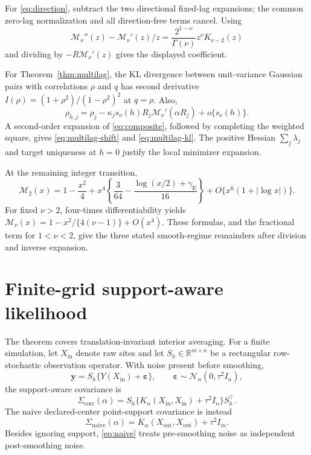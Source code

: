 \documentclass[sigconf]{acmart}
\theoremstyle{remark}
\newcommand{\Matern}{\mathcal M}
\newcommand{\R}{\mathbb R}
\newcommand{\Normal}{\mathcal N}
\begin{document}
For \eqref{eq:direction}, subtract the two directional fixed-lag expansions;
the common zero-lag normalization and all direction-free terms cancel. Using
\[
\Matern_\nu''(z)-\Matern_\nu'(z)/z
=\frac{2^{1-\nu}}{\Gamma(\nu)}z^\nu K_{\nu-2}(z)
\]
and dividing by \(-R\Matern_\nu'(z)\) gives the displayed coefficient.

For Theorem~\ref{thm:multilag}, the KL divergence between unit-variance
Gaussian pairs with correlations \(\rho\) and \(q\) has second derivative
\(I(\rho)=(1+\rho^2)/(1-\rho^2)^2\) at \(q=\rho\). Also,
\[
 \rho_{h,j}=\rho_j-\kappa_j s_\nu(h)R_j\Matern_\nu'(\alpha R_j)
 +o\{s_\nu(h)\}.
\]
A second-order expansion of \eqref{eq:composite}, followed by completing the
weighted square, gives \eqref{eq:multilag-shift} and
\eqref{eq:multilag-kl}. The positive Hessian \(\sum_j\lambda_j\) and target
uniqueness at \(h=0\) justify the local minimizer expansion.

At the remaining integer transition,
\[
\Matern_2(x)=1-\frac{x^2}{4}
+x^4\left\{\frac{3}{64}
-\frac{\log(x/2)+\gamma_{\mathrm E}}{16}\right\}
+O\{x^6(1+|\log x|)\}.
\]
For fixed \(\nu>2\), four-times differentiability yields
\(\Matern_\nu(x)=1-x^2/\{4(\nu-1)\}+O(x^4)\). These formulas, and the
fractional term for \(1<\nu<2\), give the three stated smooth-regime
remainders after division and inverse expansion.

\section{Finite-grid support-aware likelihood}

The theorem covers translation-invariant interior averaging. For a finite
simulation, let \(X_{\mathrm{in}}\) denote raw sites and let
\(S_h\in\R^{m\times n}\) be a rectangular row-stochastic observation operator.
With noise present before smoothing,
\begin{equation}
\mathbf y=S_h\{Y(X_{\mathrm{in}})+\boldsymbol\varepsilon\},\qquad
\boldsymbol\varepsilon\sim\Normal_n(0,\tau^2I_n),
\end{equation}
the support-aware covariance is
\begin{equation}
\Sigma_{\mathrm{corr}}(\alpha)
=S_h\{K_\alpha(X_{\mathrm{in}},X_{\mathrm{in}})+\tau^2I_n\}S_h^\top.
\label{eq:corr}
\end{equation}
The naive declared-center point-support covariance is instead
\begin{equation}
\Sigma_{\mathrm{naive}}(\alpha)
=K_\alpha(X_{\mathrm{out}},X_{\mathrm{out}})+\tau^2I_m.
\label{eq:naive}
\end{equation}
Besides ignoring support, \eqref{eq:naive} treats pre-smoothing noise as
independent post-smoothing noise.
\end{document}
